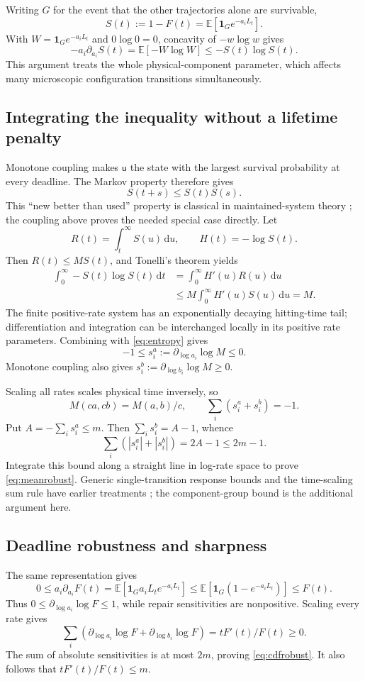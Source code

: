 \documentclass[11pt,a4paper]{article}
\newcommand{\E}{\mathbb E}
\newcommand{\one}{\mathbf 1}
\newcommand{\up}{\mathsf u}
\newcommand{\dd}{\mathrm d}
\begin{document}
Writing $G$ for the event that the other trajectories alone are survivable,
\[
 S(t):=1-F(t)=\E[\one_G e^{-a_iL_t}].
\]
With $W=\one_Ge^{-a_iL_t}$ and $0\log0=0$, concavity of $-w\log w$ gives
\begin{equation}
 -a_i\partial_{a_i}S(t)=\E[-W\log W]\le -S(t)\log S(t).\label{eq:entropy}
\end{equation}
This argument treats the whole physical-component parameter, which affects many microscopic configuration transitions simultaneously.

\subsection{Integrating the inequality without a lifetime penalty}
Monotone coupling makes $\up$ the state with the largest survival probability at every deadline. The Markov property therefore gives
\[
 S(t+s)\le S(t)S(s).
\]
This ``new better than used'' property is classical in maintained-system theory \cite{barlow}; the coupling above proves the needed special case directly. Let
\[
 R(t)=\int_t^\infty S(u)\,\dd u,\qquad H(t)=-\log S(t).
\]
Then $R(t)\le M S(t)$, and Tonelli's theorem yields
\begin{align*}
 \int_0^\infty -S(t)\log S(t)\,\dd t
 &=\int_0^\infty H'(u)R(u)\,\dd u\\
 &\le M\int_0^\infty H'(u)S(u)\,\dd u=M.
\end{align*}
The finite positive-rate system has an exponentially decaying hitting-time tail; differentiation and integration can be interchanged locally in its positive rate parameters. Combining with \eqref{eq:entropy} gives
\[
 -1\le s_i^a:=\partial_{\log a_i}\log M\le0.
\]
Monotone coupling also gives $s_i^b:=\partial_{\log b_i}\log M\ge0$.

Scaling all rates scales physical time inversely, so
\[
 M(ca,cb)=M(a,b)/c,\qquad \sum_i(s_i^a+s_i^b)=-1.
\]
Put $A=-\sum_i s_i^a\le m$. Then $\sum_i s_i^b=A-1$, whence
\begin{equation}
 \sum_i(|s_i^a|+|s_i^b|)=2A-1\le2m-1.\label{eq:elasticity}
\end{equation}
Integrate this bound along a straight line in log-rate space to prove \eqref{eq:meanrobust}. Generic single-transition response bounds and the time-scaling sum rule have earlier treatments \cite{liang}; the component-group bound is the additional argument here.

\subsection{Deadline robustness and sharpness}
The same representation gives
\[
 0\le a_i\partial_{a_i}F(t)
 =\E[\one_Ga_iL_te^{-a_iL_t}]
 \le\E[\one_G(1-e^{-a_iL_t})]\le F(t).
\]
Thus $0\le\partial_{\log a_i}\log F\le1$, while repair sensitivities are nonpositive. Scaling every rate gives
\[
 \sum_i\left(\partial_{\log a_i}\log F+
 \partial_{\log b_i}\log F\right)=tF'(t)/F(t)\ge0.
\]
The sum of absolute sensitivities is at most $2m$, proving \eqref{eq:cdfrobust}. It also follows that $tF'(t)/F(t)\le m$.
\end{document}
